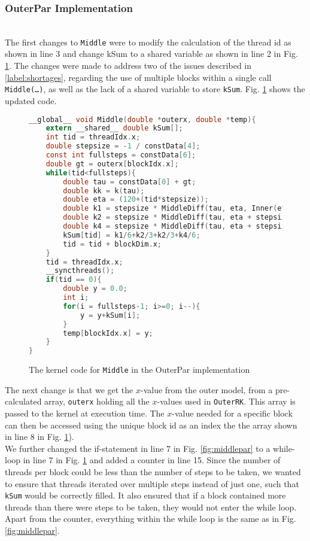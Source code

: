 \subsubsection{OuterPar Implementation} \hfill \\
The first changes to \texttt{Middle} were to modify the calculation of the thread id as shown in line 3 and change kSum to a shared variable as shown in line 2 in Fig. \ref{fig:outerpar}. The changes were made to address two of the issues described in \ref{label:shortages}, regarding the use of multiple blocks within a single call \texttt{Middle(…)}, as well as the lack of a shared variable to store \texttt{kSum}. Fig. \ref{fig:outerpar} shows the updated code.

\begin{figure}[ht!]
\begin{lstlisting}[language=c]
__global__ void Middle(double *outerx, double *temp){
	extern __shared__ double kSum[];
	int tid = threadIdx.x;
	double stepsize = -1 / constData[4];
	const int fullsteps = constData[6];
	double gt = outerx[blockIdx.x];
	while(tid<fullsteps){
		double tau = constData[0] + gt;
		double kk = k(tau);
		double eta = (120+(tid*stepsize));
		double k1 = stepsize * MiddleDiff(tau, eta, Inner(eta, gt, kk).y);
		double k2 = stepsize * MiddleDiff(tau, eta + stepsize/2, Inner(eta + stepsize/2, gt, kk).y);		
		double k4 = stepsize * MiddleDiff(tau, eta + stepsize, Inner(eta + stepsize, gt, kk).y);
		kSum[tid] = k1/6+k2/3+k2/3+k4/6;
		tid = tid + blockDim.x;
	}
	tid = threadIdx.x;
	__syncthreads();
	if(tid == 0){
		double y = 0.0;
		int i;
		for(i = fullsteps-1; i>=0; i--){
			y = y+kSum[i];
		}
		temp[blockIdx.x] = y;
	}
}
\end{lstlisting}
\caption{The kernel code for \texttt{Middle} in the OuterPar implementation}
\label{fig:outerpar}
\end{figure}

The next change is that we get the $x$-value from the outer model, from a pre-calculated array, \texttt{outerx} holding all the $x$-values used in \texttt{OuterRK}. This array is passed to the kernel at execution time. The $x$-value needed for a specific block can then be accessed using the unique block id as an index the the array shown in line 8 in Fig. \ref{fig:outerpar}).\\

We further changed the if-statement in line 7 in Fig. \ref{fig:middlepar} to a while-loop in line 7 in Fig. \ref{fig:outerpar} and added a counter in line 15. Since the number of threads per block could be less than the number of steps to be taken, we wanted to ensure that threads iterated over multiple steps instead of just one, such that \texttt{kSum} would be correctly filled. It also ensured that if a block contained more threads than there were steps to be taken, they would not enter the while loop. Apart from the counter, everything within the while loop is the same as in Fig. \ref{fig:middlepar}.\\ \\

